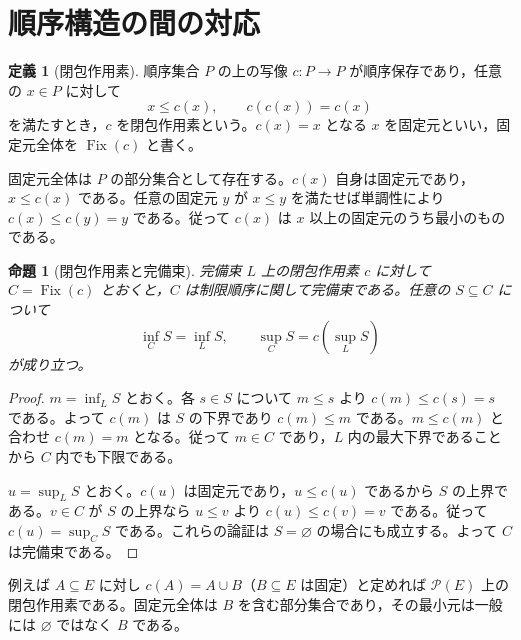 \documentclass[a5paper,10pt,dvipdfmx]{jsarticle}
\theoremstyle{definition}
\newtheorem{defn}[ruledef]{定義}
\theoremstyle{plain}
\newtheorem{prop}[ruledef]{命題}
\newcommand{\Pow}{\mathcal{P}}
\begin{document}
\section{順序構造の間の対応}
\begin{defn}[閉包作用素]\label{k91}
順序集合 $P$ の上の写像 $c:P\to P$ が順序保存であり，任意の $x\in P$ に対して
\[
 x\leq c(x),\qquad c(c(x))=c(x)
\]
を満たすとき，$c$ を閉包作用素という。$c(x)=x$ となる $x$ を固定元といい，固定元全体を $\operatorname{Fix}(c)$ と書く。
\end{defn}
固定元全体は $P$ の部分集合として存在する。$c(x)$ 自身は固定元であり，$x\leq c(x)$ である。任意の固定元 $y$ が $x\leq y$ を満たせば単調性により $c(x)\leq c(y)=y$ である。従って $c(x)$ は $x$ 以上の固定元のうち最小のものである。
\begin{prop}[閉包作用素と完備束]\label{k92}
完備束 $L$ 上の閉包作用素 $c$ に対して $C=\operatorname{Fix}(c)$ とおくと，$C$ は制限順序に関して完備束である。任意の $S\subseteq C$ について
\[
 \inf_C S=\inf_L S,\qquad \sup_C S=c(\sup_L S)
\]
が成り立つ。
\end{prop}
\begin{proof}
$m=\inf_L S$ とおく。各 $s\in S$ について $m\leq s$ より $c(m)\leq c(s)=s$ である。よって $c(m)$ は $S$ の下界であり $c(m)\leq m$ である。$m\leq c(m)$ と合わせ $c(m)=m$ となる。従って $m\in C$ であり，$L$ 内の最大下界であることから $C$ 内でも下限である。

$u=\sup_L S$ とおく。$c(u)$ は固定元であり，$u\leq c(u)$ であるから $S$ の上界である。$v\in C$ が $S$ の上界なら $u\leq v$ より $c(u)\leq c(v)=v$ である。従って $c(u)=\sup_C S$ である。これらの論証は $S=\varnothing$ の場合にも成立する。よって $C$ は完備束である。
\end{proof}
例えば $A\subseteq E$ に対し $c(A)=A\cup B$（$B\subseteq E$ は固定）と定めれば $\Pow(E)$ 上の閉包作用素である。固定元全体は $B$ を含む部分集合であり，その最小元は一般には $\varnothing$ ではなく $B$ である。
\end{document}
